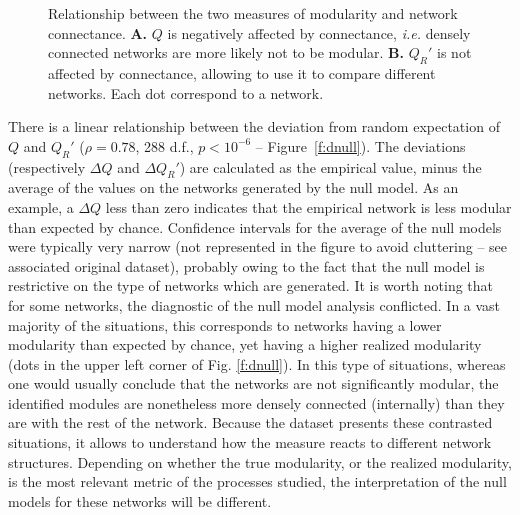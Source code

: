 \documentclass[12pt,oneside]{article}
\begin{document}
\begin{figure}[tbp]
\begin{center}
%		
\end{center}
\caption{Relationship between the two measures of modularity and network connectance. \textbf{A.} $Q$ is negatively affected by connectance, \emph{i.e.} densely connected networks are more likely not to be modular. \textbf{B.} $Q_R'$ is not affected by connectance, allowing to use it to compare different networks. Each dot correspond to a network.}
\label{f:co}
\end{figure}

There is a linear relationship between the deviation from random
expectation of $Q$ and $Q_R'$ ($\rho = 0.78$, 288 d.f., $p < 10^{-6}$
-- Figure~\ref{f:dnull}). The deviations (respectively $\Delta Q$ and
$\Delta Q_R'$) are calculated as the empirical value, minus the average
of the values on the networks generated by the null model. As an example,
a $\Delta Q$ less than zero indicates that the empirical network is less
modular than expected by chance. Confidence intervals for the average of
the null models were typically very narrow (not represented in the figure
to avoid cluttering -- see associated original dataset), probably owing to
the fact that the null model is restrictive on the type of networks which
are generated. It is worth noting that for some networks, the diagnostic of
the null model analysis conflicted.  In a vast majority of the situations,
this corresponds to networks having a lower modularity than expected by
chance, yet having a higher realized modularity (dots in the upper left
corner of Fig. \ref{f:dnull}). In this type of situations, whereas one
would usually conclude that the networks are not significantly modular,
the identified modules are nonetheless more densely connected (internally)
than they are with the rest of the network. Because the dataset presents
these contrasted situations, it allows to understand how the measure reacts
to different network structures. Depending on whether the true modularity, or
the realized modularity, is the most relevant metric of the processes studied,
the interpretation of the null models for these networks will be different.
\end{document}
